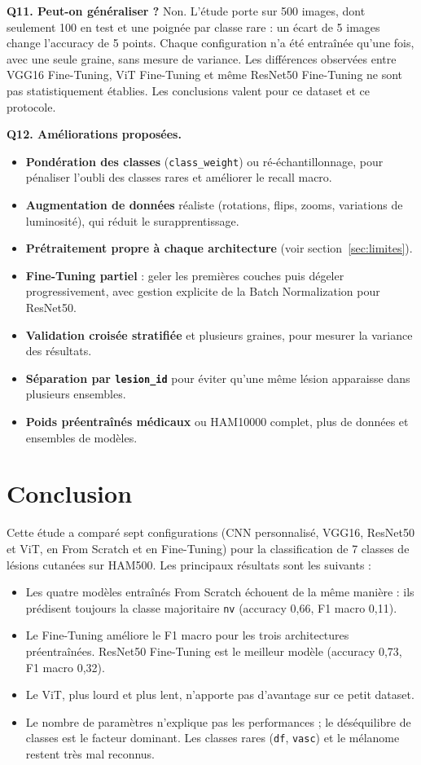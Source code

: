 \documentclass[12pt,a4paper]{article}
\begin{document}
\textbf{Q11. Peut-on généraliser ?} Non. L'étude porte sur 500 images, dont seulement 100 en test et une poignée par classe rare : un écart de 5 images change l'accuracy de 5 points. Chaque configuration n'a été entraînée qu'une fois, avec une seule graine, sans mesure de variance. Les différences observées entre VGG16 Fine-Tuning, ViT Fine-Tuning et même ResNet50 Fine-Tuning ne sont pas statistiquement établies. Les conclusions valent pour ce dataset et ce protocole.

\textbf{Q12. Améliorations proposées.}
\begin{itemize}[nosep]
  \item \textbf{Pondération des classes} (\texttt{class\_weight}) ou ré-échantillonnage, pour pénaliser l'oubli des classes rares et améliorer le recall macro.
  \item \textbf{Augmentation de données} réaliste (rotations, flips, zooms, variations de luminosité), qui réduit le surapprentissage.
  \item \textbf{Prétraitement propre à chaque architecture} (voir section~\ref{sec:limites}).
  \item \textbf{Fine-Tuning partiel} : geler les premières couches puis dégeler progressivement, avec gestion explicite de la Batch Normalization pour ResNet50.
  \item \textbf{Validation croisée stratifiée} et plusieurs graines, pour mesurer la variance des résultats.
  \item \textbf{Séparation par \texttt{lesion\_id}} pour éviter qu'une même lésion apparaisse dans plusieurs ensembles.
  \item \textbf{Poids préentraînés médicaux} ou HAM10000 complet, plus de données et ensembles de modèles.
\end{itemize}

\section{Conclusion}
Cette étude a comparé sept configurations (CNN personnalisé, VGG16, ResNet50 et ViT, en From Scratch et en Fine-Tuning) pour la classification de 7 classes de lésions cutanées sur HAM500. Les principaux résultats sont les suivants :
\begin{itemize}[nosep]
  \item Les quatre modèles entraînés From Scratch échouent de la même manière : ils prédisent toujours la classe majoritaire \texttt{nv} (accuracy 0,66, F1 macro 0,11).
  \item Le Fine-Tuning améliore le F1 macro pour les trois architectures préentraînées. ResNet50 Fine-Tuning est le meilleur modèle (accuracy 0,73, F1 macro 0,32).
  \item Le ViT, plus lourd et plus lent, n'apporte pas d'avantage sur ce petit dataset.
  \item Le nombre de paramètres n'explique pas les performances ; le déséquilibre de classes est le facteur dominant. Les classes rares (\texttt{df}, \texttt{vasc}) et le mélanome restent très mal reconnus.
\end{itemize}
\end{document}

